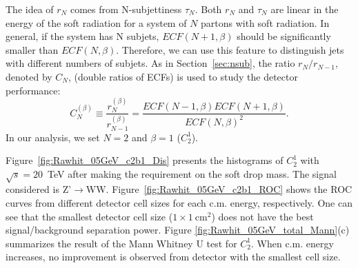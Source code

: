 The idea of $r_N$ comes from N-subjettiness $\tau_N$. Both $r_N$ and $\tau_N$ 
are linear in the energy of the soft radiation for a system of $N$ partons 
with soft radiation. In general, if the system has N subjets, $ECF(N+1,\beta)$ 
should be significantly smaller than $ECF(N,\beta)$. Therefore, we can use this
 feature to distinguish jets with different numbers  of subjets. 
As in Section~\ref{sec:nsub}, the ratio $r_N/r_{N-1}$, denoted by $C_N$, 
(double ratios of ECFs) is used to study the detector performance: 
\begin{equation}
C_{N}^{(\beta)}\equiv\frac{r_{N}^{(\beta)}}{r_{N-1}^{(\beta)}}=\frac{ECF(N-1,\beta)ECF(N+1,\beta)}{ECF(N,\beta)^2}.
\end{equation}
In our analysis, we set $N=2$ and $\beta=1$ ($C_2^1$).

Figure~\ref{fig:Rawhit_05GeV_c2b1_Dis} presents the histograms of $C_{2}^{1}$ 
with $\sqrt{s}=20$~TeV after making the requirement on the soft drop mass. 
The signal considered is Z'$\rightarrow$WW. 
Figure~\ref{fig:Rawhit_05GeV_c2b1_ROC} shows the ROC curves from different 
detector cell sizes for each c.m. energy, respectively. One can see that 
the smallest detector cell size ($1\times1~\mathrm{cm}^2$) does not have the 
best signal/background separation power. 
Figure \ref{fig:Rawhit_05GeV_total_Mann}(c) summarizes the result of 
the Mann Whitney U test for $C_{2}^{1}$. When c.m. energy increases, 
no improvement is observed from detector with the smallest cell size. 


